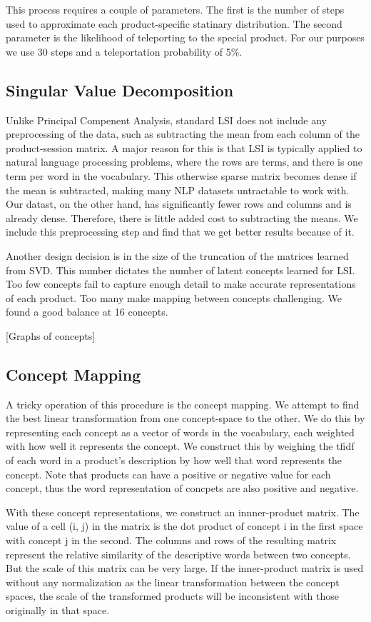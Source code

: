 \documentclass[11pt]{article}
\begin{document}
This process requires a couple of parameters. The first is the number of steps
used to approximate each product-specific statinary distribution. The second
parameter is the likelihood of teleporting to the special product. For our
purposes we use 30 steps and a teleportation probability of 5\%.

\subsection*{Singular Value Decomposition}
Unlike Principal Compenent Analysis, standard LSI does not include any
preprocessing of the data, such as subtracting the mean from each column of the
product-session matrix. A major reason for this is that LSI is typically applied
to natural language processing problems, where the rows are terms, and there is
one term per word in the vocabulary. This otherwise sparse matrix becomes dense
if the mean is subtracted, making many NLP datasets untractable to work with. 
Our datast, on the other hand, has significantly fewer rows and columns and is
already dense. Therefore, there is little added cost to subtracting the
means. We include this preprocessing step and find that we get better results
because of it.

Another design decision is in the size of the truncation of the matrices learned
from SVD. This number dictates the number of latent concepts learned for LSI.
Too few concepts fail to capture enough detail to make accurate representations
of each product. Too many make mapping between concepts challenging. We found a
good balance at 16 concepts. 

[Graphs of concepts]

\subsection*{Concept Mapping}
A tricky operation of this procedure is the concept mapping. We attempt to find
the best linear transformation from one concept-space to the other. We do this
by representing each concept as a vector of words in the vocabulary, each
weighted with how well it represents the concept. We construct this by weighing
the tfidf of each word in a product's description by how well that word
represents the concept. Note that products can have a positive or negative value
for each concept, thus the word representation of concpets are also positive and
negative. 

With these concept representations, we construct an innner-product matrix. The 
value of a cell (i, j) in the matrix is the dot product of concept i in the first 
space with concept j in the second. The columns and rows of the resulting matrix
represent the relative similarity of the descriptive words between two concepts.
But the scale of this matrix can be very large. If the inner-product matrix is
used without any normalization as the linear transformation between the concept
spaces, the scale of the transformed products will be inconsistent with those
originally in that space. 
\end{document}
